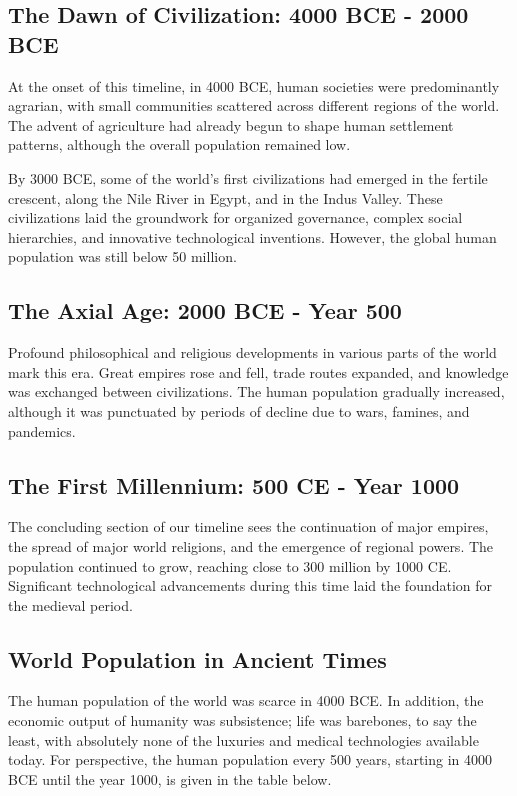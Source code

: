 \documentclass[a4paper,12pt]{book}
\begin{document}
\subsection*{The Dawn of Civilization: 4000 BCE - 2000 BCE}
At the onset of this timeline, in 4000 BCE, human societies were predominantly agrarian, with small communities scattered across different regions of the world. The advent of agriculture had already begun to shape human settlement patterns, although the overall population remained low.

By 3000 BCE, some of the world's first civilizations had emerged in the fertile crescent, along the Nile River in Egypt, and in the Indus Valley. These civilizations laid the groundwork for organized governance, complex social hierarchies, and innovative technological inventions. However, the global human population was still below 50 million.

\subsection*{The Axial Age: 2000 BCE - Year 500}
Profound philosophical and religious developments in various parts of the world mark this era. Great empires rose and fell, trade routes expanded, and knowledge was exchanged between civilizations. The human population gradually increased, although it was punctuated by periods of decline due to wars, famines, and pandemics.

\subsection*{The First Millennium: 500 CE - Year 1000}
The concluding section of our timeline sees the continuation of major empires, the spread of major world religions, and the emergence of regional powers. The population continued to grow, reaching close to 300 million by 1000 CE. Significant technological advancements during this time laid the foundation for the medieval period.

\subsection*{World Population in Ancient Times}
The human population of the world was scarce in 4000 BCE. In addition, the economic output of humanity was subsistence; life was barebones, to say the least, with absolutely none of the luxuries and medical technologies available today. For perspective, the human population every 500 years, starting in 4000 BCE until the year 1000, is given in the table below.
\end{document}
